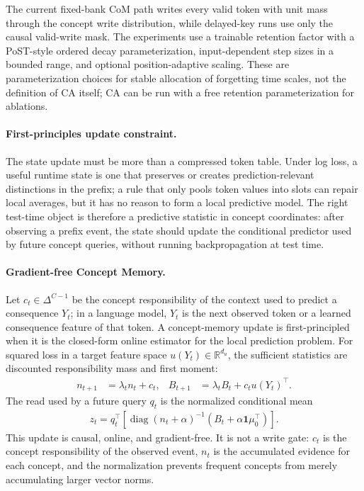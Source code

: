 The current fixed-bank CoM path writes every valid token with unit mass through the concept write distribution, while delayed-key runs use only the causal valid-write mask. The experiments use a trainable retention factor with a PoST-style ordered decay parameterization, input-dependent step sizes in a bounded range, and optional position-adaptive scaling. These are parameterization choices for stable allocation of forgetting time scales, not the definition of CA itself; CA can be run with a free retention parameterization for ablations.

\paragraph{First-principles update constraint.}
The state update must be more than a compressed token table. Under log loss, a useful runtime state is one that preserves or creates prediction-relevant distinctions in the prefix; a rule that only pools token values into slots can repair local averages, but it has no reason to form a local predictive model. The right test-time object is therefore a predictive statistic in concept coordinates: after observing a prefix event, the state should update the conditional predictor used by future concept queries, without running backpropagation at test time.

\paragraph{Gradient-free Concept Memory.}
Let $c_t\in\Delta^{C-1}$ be the concept responsibility of the context used to predict a consequence $Y_t$; in a language model, $Y_t$ is the next observed token or a learned consequence feature of that token. A concept-memory update is first-principled when it is the closed-form online estimator for the local prediction problem. For squared loss in a target feature space $u(Y_t)\in\mathbb{R}^{d_u}$, the sufficient statistics are discounted responsibility mass and first moment:
\begin{align*}
n_{t+1}
&=
\lambda_t n_t+c_t,
&
B_{t+1}
&=
\lambda_t B_t+c_t u(Y_t)^\top .
\end{align*}
The read used by a future query $q_t$ is the normalized conditional mean
\begin{align*}
z_t
=
q_t^\top
\left[
\operatorname{diag}(n_t+\alpha)^{-1}
\left(B_t+\alpha \mathbf{1}\mu_0^\top\right)
\right].
\end{align*}
This update is causal, online, and gradient-free. It is not a write gate: $c_t$ is the concept responsibility of the observed event, $n_t$ is the accumulated evidence for each concept, and the normalization prevents frequent concepts from merely accumulating larger vector norms.

